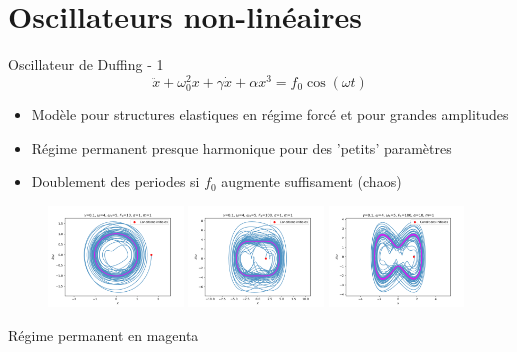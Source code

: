 \section{Oscillateurs non-linéaires}
\begin{frame}{Oscillateur de Duffing - 1}
    $$ \ddot{x} + \omega_0^2 x + \gamma \dot{x} + \alpha x^3 = f_0\cos(\omega t)$$
    
    \begin{itemize}
        \item Modèle pour structures elastiques en régime forcé et pour grandes amplitudes \cite{rand_lecture_2012}
        \item Régime permanent presque harmonique pour des 'petits' paramètres
        \item Doublement des periodes si $f_0$ augmente suffisament (chaos)
    \end{itemize}

    \begin{figure}
        \includegraphics[width=0.32\textwidth]{images/duffing/duffing_single_phase_plot_x0=0.4750630195324652_v0=0_gamma=0.1_w0=5_w=4_f0=10_alpha=1_epsilon=1.png}
        \includegraphics[width=0.32\textwidth]{images/duffing/duffing_single_phase_plot_x0=0.4750630195324652_v0=0_gamma=0.1_w0=5_w=4_f0=100_alpha=1_epsilon=1.png}
        \includegraphics[width=0.32\textwidth]{images/duffing/duffing_single_phase_plot_x0=0.4750630195324652_v0=0_gamma=0.1_w0=5_w=4_f0=100_alpha=10_epsilon=1.png}
    \end{figure}

    \begin{center}{\tiny Régime permanent en magenta}\end{center}
\end{frame}

